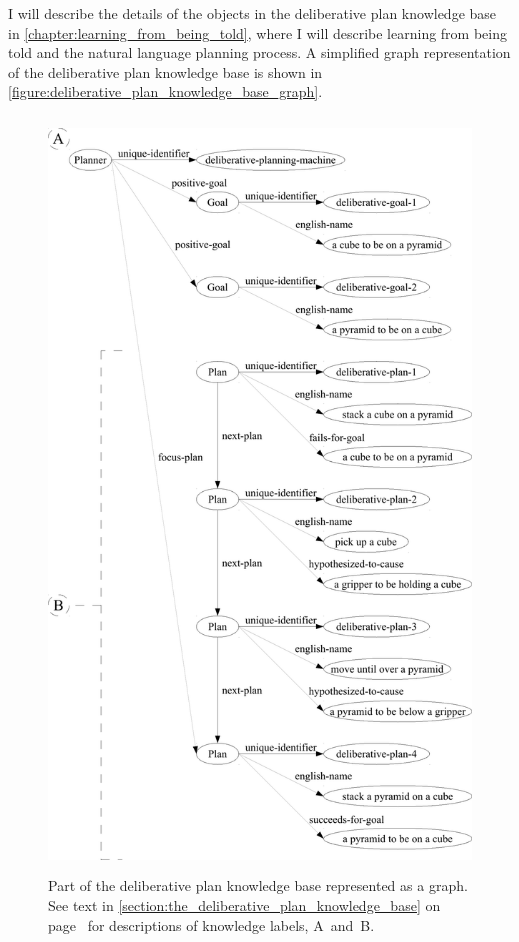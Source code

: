 I will describe the details of the objects in the deliberative plan
knowledge base in {\mbox{\autoref{chapter:learning_from_being_told}}},
where I will describe learning from being told and the natural
language planning process.  A simplified graph representation of the
deliberative plan knowledge base is shown in
{\mbox{\autoref{figure:deliberative_plan_knowledge_base_graph}}}.
\label{page:deliberative_plan_knowledge_base_graph-label_descriptions}
\begin{figure}
\hspace{0cm}\includegraphics[height=20cm]{gfx/deliberative_plan_knowledge_base_graph-handdrawn}
\caption[Part of the deliberative plan knowledge base represented as a
  graph.]{Part of the deliberative plan knowledge base represented as
  a graph.  See text in
  {\mbox{\autoref{section:the_deliberative_plan_knowledge_base}}} on
  {\mbox{page~\pageref{page:deliberative_plan_knowledge_base_graph-label_descriptions}}}
  for descriptions of knowledge labels, {\mbox{A~and~B}}.}
\label{figure:deliberative_plan_knowledge_base_graph}
\end{figure}
